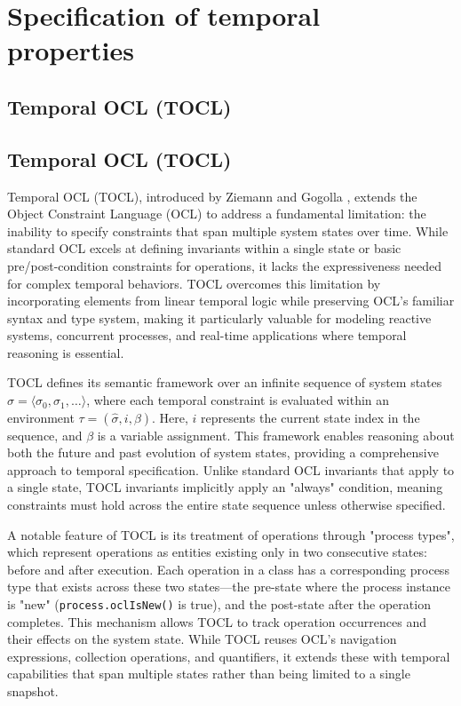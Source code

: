 \section{Specification of temporal properties}

\subsection{Temporal OCL (TOCL)}

\subsection{Temporal OCL (TOCL)}

\hspace{1cm} Temporal OCL (TOCL), introduced by Ziemann and Gogolla \cite{TOCL}, 
extends the Object Constraint Language (OCL) to address a fundamental limitation: 
the inability to specify constraints that span multiple system states over time. 
While standard OCL excels at defining invariants within a single state or basic 
pre/post-condition constraints for operations, it lacks the expressiveness needed 
for complex temporal behaviors. TOCL overcomes this limitation by incorporating 
elements from linear temporal logic while preserving OCL's familiar syntax and type 
system, making it particularly valuable for modeling reactive systems, concurrent 
processes, and real-time applications where temporal reasoning is essential.

TOCL defines its semantic framework over an infinite sequence of system states 
$\hat{\sigma} = \langle \sigma_0, \sigma_1, \ldots \rangle$, where each temporal 
constraint is evaluated within an environment $\tau = (\hat{\sigma}, i, \beta)$. 
Here, $i$ represents the current state index in the sequence, and $\beta$ is a 
variable assignment. This framework enables reasoning about both the future and 
past evolution of system states, providing a comprehensive approach to temporal 
specification. Unlike standard OCL invariants that apply to a single state, TOCL 
invariants implicitly apply an "always" condition, meaning constraints must hold 
across the entire state sequence unless otherwise specified.

A notable feature of TOCL is its treatment of operations through "process types", 
which represent operations as entities existing only in two consecutive states: 
before and after execution. Each operation in a class has a corresponding process 
type that exists across these two states—the pre-state where the process instance is 
"new" (\texttt{process.oclIsNew()} is true), and the post-state after the operation 
completes. This mechanism allows TOCL to track operation occurrences and their 
effects on the system state. While TOCL reuses OCL's navigation 
expressions, collection operations, and quantifiers, it extends these with temporal 
capabilities that span multiple states rather than being limited to a single snapshot.


